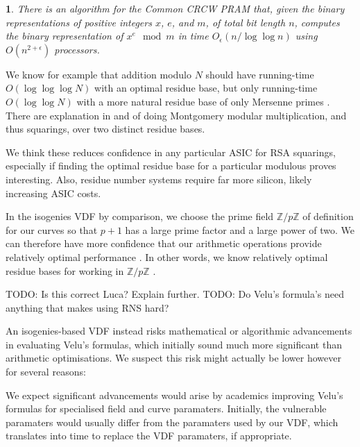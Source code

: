 \documentclass{article}
\newtheorem*{rawnamedtheorem}{\therawnamedtheorem}
\newcommand{\therawnamedtheorem}{\error}
\newenvironment{namedtheorem}[1]{\renewcommand{\therawnamedtheorem}{#1}
   \begin{rawnamedtheorem}}
  {\end{rawnamedtheorem}}
\newcommand{\Z}{\mathbb{Z}}
\begin{document}
\begin{namedtheorem}{Theorem 8.1 of \cite{BernsteinSorenson07}}
There is an algorithm for the Common CRCW PRAM that, given the binary
representations of positive integers $x$, $e$, and $m$, of total bit
length $n$, computes the binary representation of $x^e \mod m$ in time
$O_\epsilon(n / \log \log n)$ using $O(n^{2+\epsilon})$ processors.
\end{namedtheorem}


We know for example that addition modulo $N$ should have running-time
$O(\log \log \log N)$ with an optimal residue base, but only
running-time $O(\log \log N)$ with a more natural residue base of only
Mersenne primes \cite[\S4.6]{Parhami}.
There are explanation in \cite{RNSonGPU07} and \cite{Araujo12} of
doing Montgomery modular multiplication, and thus squarings, over
two distinct residue bases. 



We think these reduces confidence in any particular ASIC for RSA
squarings, especially if finding the optimal residue base for a
particular modulous proves interesting.  Also, residue number systems
require far more silicon, likely increasing ASIC costs.

In the isogenies VDF by comparison, we choose the prime field $\Z/p\Z$
of definition for our curves so that $p+1$ has a large prime factor
and a large power of two.  
We can therefore have more confidence that our arithmetic operations
provide relatively optimal performance \cite{????}.  In other words,
we know relatively optimal residue bases for working in $\Z/p\Z$ \cite{????}.

TODO: Is this correct Luca?  Explain further.  
TODO: Do Velu's formula's need anything that makes using RNS hard?

An isogenies-based VDF instead risks mathematical or algorithmic
advancements in evaluating Velu's formulas, which initially sound
much more significant than arithmetic optimisations.  We suspect
this risk might actually be lower however for several reasons:

We expect significant advancements would arise by academics improving
Velu's formulas for specialised field and curve paramaters.
Initially, the vulnerable paramaters would usually differ from the
paramaters used by our VDF, which translates into time to replace
the VDF paramaters, if appropriate.  
\end{document}
